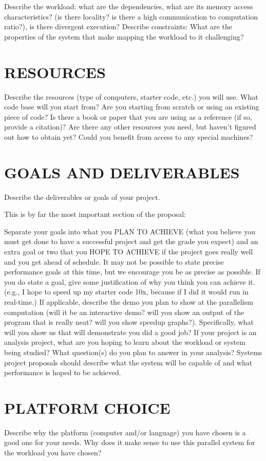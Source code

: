 \documentclass[11pt]{article}
\begin{document}
Describe the workload: what are the dependencies, what are its memory access characteristics? (is there locality? is there a high communication to computation ratio?), is there divergent execution?
Describe constraints: What are the properties of the system that make mapping the workload to it challenging?

\section{RESOURCES}
Describe the resources (type of computers, starter code, etc.) you will use. What code base will you start from? Are you starting from scratch or using an existing piece of code? Is there a book or paper that you are using as a reference (if so, provide a citation)? Are there any other resources you need, but haven't figured out how to obtain yet? Could you benefit from access to any special machines?

\section{GOALS AND DELIVERABLES}
Describe the deliverables or goals of your project.

This is by far the most important section of the proposal:

Separate your goals into what you PLAN TO ACHIEVE (what you believe you must get done to have a successful project and get the grade you expect) and an extra goal or two that you HOPE TO ACHIEVE if the project goes really well and you get ahead of schedule. It may not be possible to state precise performance goals at this time, but we encourage you be as precise as possible. If you do state a goal, give some justification of why you think you can achieve it. (e.g., I hope to speed up my starter code 10x, because if I did it would run in real-time.)
If applicable, describe the demo you plan to show at the parallelism computation (will it be an interactive demo? will you show an output of the program that is really neat? will you show speedup graphs?). Specifically, what will you show us that will demonstrate you did a good job?
If your project is an analysis project, what are you hoping to learn about the workload or system being studied? What question(s) do you plan to answer in your analysis?
Systems project proposals should describe what the system will be capable of and what performance is hoped to be achieved.
\section{PLATFORM CHOICE} Describe why the platform (computer and/or language) you have chosen is a good one for your needs. Why does it make sense to use this parallel system for the workload you have chosen?
\end{document}
